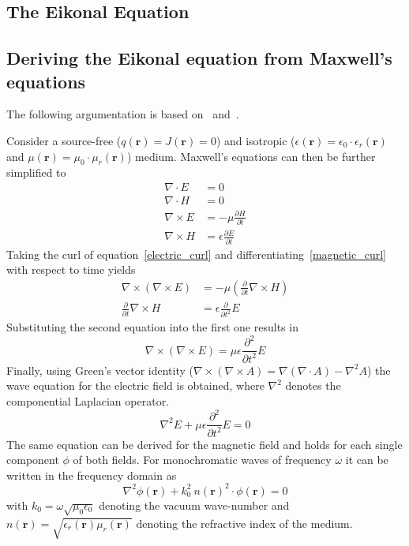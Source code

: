 \subsection{The Eikonal Equation}

\subsection{Deriving the Eikonal equation from Maxwell's equations}
The following argumentation is based on~\parencite{born_geometrische_1933} and~\parencite{sommerfeld_anwendung_1911}.

Consider a source-free (\(q(\mathbf{r}) = J(\mathbf{r}) = 0\)) and isotropic (\(\epsilon(\mathbf{r}) = \epsilon_0 \cdot \epsilon_r(\mathbf{r})\) and \(\mu(\mathbf{r}) = \mu_0 \cdot \mu_r(\mathbf{r})\)) medium.
Maxwell's equations can then be further simplified to
\begin{align}
    \nabla \cdot E &= 0 \\
    \nabla \cdot H &= 0 \\
    \nabla \times E &= -\mu \frac{\partial H}{\partial t}\label{electric_curl} \\
    \nabla \times H &= \epsilon \frac{\partial E}{\partial t}\label{magnetic_curl}
\end{align}
Taking the curl of equation~\eqref{electric_curl} and differentiating~\eqref{magnetic_curl} with respect to time yields
\begin{align}
    \nabla \times (\nabla \times E) &= -\mu (\frac{\partial}{\partial t} \nabla \times H) \\
    \frac{\partial}{\partial t} \nabla \times H &= \epsilon \frac{\partial}{\partial t^2} E
\end{align}
Substituting the second equation into the first one results in
\begin{equation}
    \nabla \times (\nabla \times E) = \mu \epsilon \frac{\partial^2}{\partial t^2} E
\end{equation}
Finally, using Green's vector identity (\(\nabla \times (\nabla \times A) = \nabla(\nabla \cdot A) - \nabla^2 A\)) the wave equation for the electric field is obtained, where \(\nabla^2\) denotes the componential Laplacian operator.
\begin{equation}
    \nabla^2 E + \mu \epsilon \frac{\partial^2}{\partial t^2} E = 0
\end{equation}
The same equation can be derived for the magnetic field and holds for each single component \(\phi \) of both fields.
For monochromatic waves of frequency \(\omega \) it can be written in the frequency domain as
\begin{equation}\label{electromagnetic_wave_equation}
    \nabla^2 \phi(\mathbf{r}) + k_0^2\ n{(\mathbf{r})}^2 \cdot \phi(\mathbf{r}) = 0
\end{equation}
with \(k_0 = \omega \sqrt{\mu_0 \epsilon_0} \) denoting the vacuum wave-number and \(n(\mathbf{r}) = \sqrt{\epsilon_r(\mathbf{r}) \mu_r(\mathbf{r})}\) denoting the refractive index of the medium.

